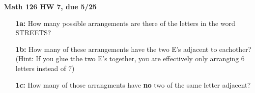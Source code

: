 \documentclass[12pt]{amsart}
\begin{document}
\begin{center}
{\bf Math 126 HW 7, due 5/25}
\end{center}


\begin{problem}
\begin{itemize}
	\item[\textbf{1a:}] How many possible arrangements are there of the letters in the word STREETS?
	\item[\textbf{1b:}] How many of these arrangements have the two E's adjacent to eachother? (Hint: If you glue tthe two E's together, you are effectively only arranging $6$ letters instead of $7$)
	\item[\textbf{1c:}] How many of those arrangments have \textbf{no} two of the same letter adjacent?
\end{itemize}
\end{problem}
\end{document}
